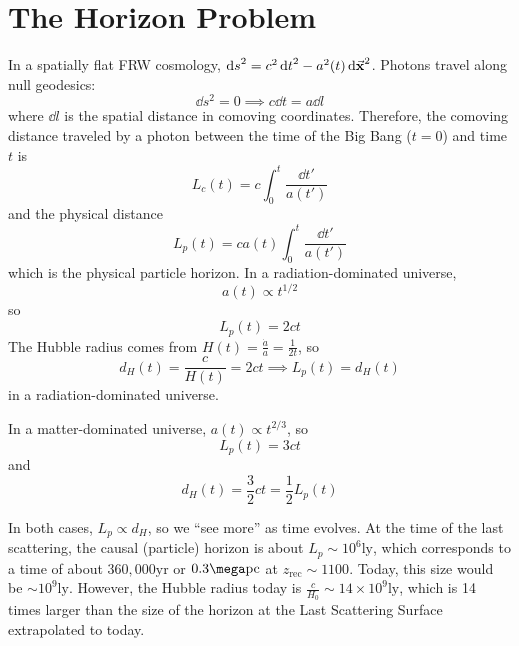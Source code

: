 \documentclass[a4paper,twoside,master.tex]{subfiles}
\begin{document}

\section{The Horizon Problem}\label{sec:the_horizon_problem}

In a spatially flat FRW cosmology, $ \dd{s}^2 = c^2 \dd{t}^2 - a^2(t) \dd{\va{x}}^2 $. Photons travel along null geodesics:
\begin{equation}
    \dd{s}^2 = 0 \implies c \dd{t} = a \dd{l}
\end{equation}
where $ \dd{l} $ is the spatial distance in comoving coordinates. Therefore, the comoving distance traveled by a photon between the time of the Big Bang ($ t=0 $) and time $ t $ is
\begin{equation}
    L_c(t) = c \int_0^t \frac{\dd{t'}}{a(t')}
\end{equation}
and the physical distance
\begin{equation}
    L_p(t) = c a(t) \int_0^t \frac{\dd{t'}}{a(t')}
\end{equation}
which is the physical particle horizon. In a radiation-dominated universe,
\begin{equation}
    a(t) \propto t^{1/2}
\end{equation}
so
\begin{equation}
    L_p(t) = 2ct
\end{equation}
The Hubble radius comes from $ H(t) = \frac{\dot{a}}{a} = \frac{1}{2t} $, so
\begin{equation}
    d_H(t) = \frac{c}{H(t)} = 2ct \implies L_p(t) = d_H(t)
\end{equation}
in a radiation-dominated universe.

In a matter-dominated universe, $ a(t) \propto t^{2/3} $, so
\begin{equation}
    L_p(t) = 3ct
\end{equation}
and
\begin{equation}
    d_H(t) = \frac{3}{2} ct = \frac{1}{2} L_p(t)
\end{equation}

In both cases, $ L_p \propto d_H $, so we ``see more'' as time evolves. At the time of the last scattering, the causal (particle) horizon is about $ L_p \sim 10^6 \text{ly} $, which corresponds to a time of about $ 360,000 \text{yr} $ or $ 0.3\mega \text{pc} $ at $ z_{\text{rec}} \sim 1100 $. Today, this size would be $ \sim 10^9 \text{ly} $. However, the Hubble radius today is $ \frac{c}{H_0} \sim 14 \times 10^9 \text{ly} $, which is 14 times larger than the size of the horizon at the Last Scattering Surface extrapolated to today.
\end{document}
